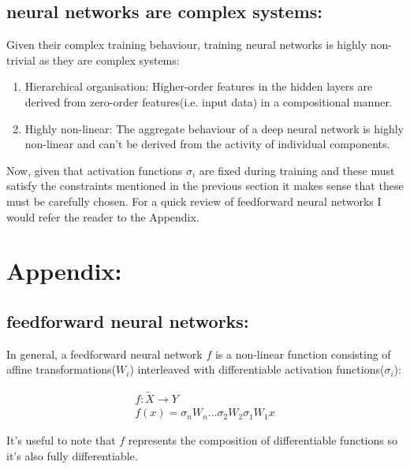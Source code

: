 \documentclass[11pt]{article}
\theoremstyle{plain}
\theoremstyle{definition}
\begin{document}
\subsection{neural networks are complex systems:}

Given their complex training behaviour, training neural networks is highly non-trivial as they are complex systems:

\begin{enumerate}

\item Hierarchical organisation: Higher-order features in the hidden layers are derived from zero-order features(i.e. input data) in a compositional manner. 

\item Highly non-linear: The aggregate behaviour of a deep neural network is highly non-linear and can't be derived from the activity of individual components. 

\end{enumerate}

Now, given that activation functions $\sigma_i$ are fixed during training and these must satisfy the constraints mentioned in the previous
section it makes sense that these must be carefully chosen. For a quick review of feedforward neural networks I would refer the reader 
to the Appendix. 


\section{Appendix:}

\subsection{feedforward neural networks:}

In general, a feedforward neural network $f$ is a non-linear function consisting of affine transformations($W_i$)
interleaved with differentiable activation functions($\sigma_i$):

\begin{equation}
\begin{gathered}
f: \widetilde{X} \rightarrow Y \\
f(x) = \sigma_n W_n ... \sigma_2 W_2 \sigma_1 W_1 x  
\end{gathered}
\end{equation}

It's useful to note that $f$ represents the composition of differentiable functions so it's also fully differentiable. 
\end{document}
